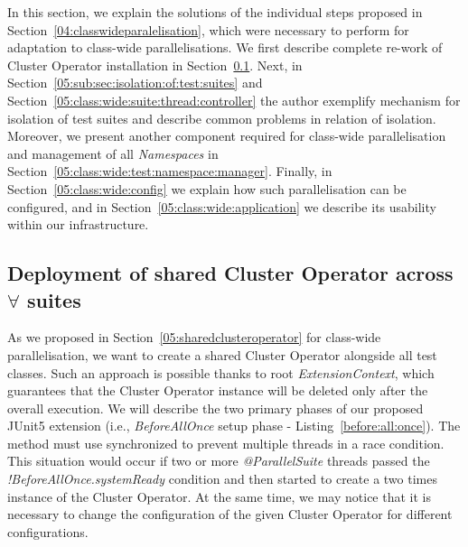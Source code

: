 In this section, we explain the solutions of the individual steps proposed in Section~\ref{04:classwideparalelisation},
which were necessary to perform for adaptation to class-wide parallelisations.
We first describe complete re-work of Cluster Operator installation in Section~\ref{05:class:wide:shared:co}.
Next, in Section~\ref{05:sub:sec:isolation:of:test:suites} and Section~\ref{05:class:wide:suite:thread:controller}
the author exemplify mechanism for isolation of test suites and describe common problems in relation of isolation.
Moreover, we present another component required for class-wide parallelisation
and management of all \emph{Namespaces} in Section~\ref{05:class:wide:test:namespace:manager}.
Finally, in Section~\ref{05:class:wide:config} we explain how such parallelisation can be configured, and
in Section~\ref{05:class:wide:application} we describe its usability within our infrastructure.

\subsection{Deployment of shared Cluster Operator across $\forall$ suites}
\label{05:class:wide:shared:co}

As we proposed in Section~\ref{05:sharedclusteroperator} for class-wide parallelisation,
we want to create a shared Cluster Operator alongside all test classes.
Such an approach is possible thanks to root \emph{ExtensionContext}, which guarantees that the Cluster Operator instance
will be deleted only after the overall execution. We will describe the two primary phases of our proposed JUnit5 extension
(i.e., \emph{BeforeAllOnce} setup phase - Listing~\ref{before:all:once}).
The method must use synchronized to prevent multiple threads in a race condition.
This situation would occur if two or more \emph{@ParallelSuite} threads passed the \emph{!BeforeAllOnce.systemReady}
condition and then started to create a two times instance of the Cluster Operator.
At the same time, we may notice that it is necessary to change the configuration of the given Cluster Operator for different configurations.

